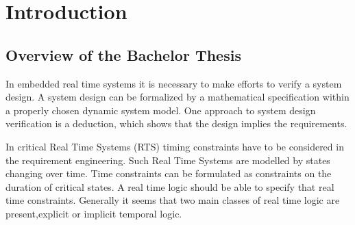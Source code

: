 






\chapter{Introduction}  %

\ifpdf
    \graphicspath{{Chapter1/Figs/Raster/}{Chapter1/Figs/PDF/}{Chapter1/Figs/}}
\else
    \graphicspath{{Chapter1/Figs/Vector/}{Chapter1/Figs/}}
\fi


\section{Overview of the Bachelor Thesis } %

In embedded real time systems it is necessary to make efforts to verify a system design.
A system design can be formalized by a mathematical specification within a properly chosen dynamic system model.
One approach to system design verification is a deduction, which shows that the design implies the requirements. 

In critical Real Time Systems (RTS) timing constraints have to be considered in the requirement engineering.
Such Real Time Systems are modelled by states changing over time.
Time constraints can be formulated as constraints on the duration of critical states. 
A real time logic should be able to specify that real time constraints. Generally it seems that two main classes
of real time logic are present,explicit or implicit temporal logic.\cite{210306} 

